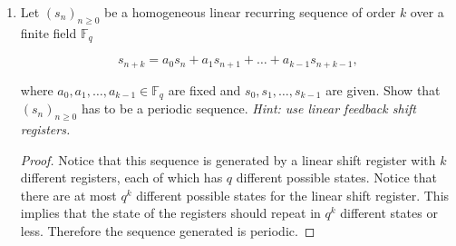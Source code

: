 \documentclass[12pt]{article}
\begin{document}
\begin{enumerate}
    \begin{proof}
    The generator matrix is given by:
    
    $$\left ( \begin{array}{*{9} c}
         2 & 0 & 0 & 1 & 0 & 0 & 0 & 0 & 0  \\
         0 & 2 & 0 & 0 & 1 & 0 & 0 & 0 & 0 \\ 
         0 & 0 & 2 & 0 & 0 & 1 & 0 & 0 & 0 \\
         0 & 0 & 0 & 2 & 0 & 0 & 1 & 0 & 0 \\
         0 & 0 & 0 & 0 & 2 & 0 & 0 & 1 & 0 \\
         0 & 0 & 0 & 0 & 0 & 2 & 0 & 0 & 1 \\
    \end{array} \right )$$
    
    Operating the matrix above through elementary operations yields the following systematic generator matrix:
    
    $$G =\left ( \begin{array}{*{9}c}
         1 & 0 & 0 & 0 & 0 & 0 & 2 & 0 & 0\\
         0 & 1 & 0 & 0 & 0 & 0 & 0 & 2 & 0\\
         0 & 0 & 1 & 0 & 0 & 0 & 0 & 0 & 2\\
         0 & 0 & 0 & 1 & 0 & 0 & 2 & 0 & 0 \\
         0 & 0 & 0 & 0 & 1 & 0 & 0 & 2 & 0\\
         0 & 0 & 0 & 0 & 0 & 1 & 0 & 0 & 2\\
    \end{array}\right)$$
    \end{proof}
    
    \item Let $(s_n)_{n \geq 0}$ be a homogeneous linear recurring sequence of order $k$ over a finite field $\mathbb{F}_q$
    
    $$ s_{n+k} = a_0 s_n + a_1 s_{n+1}+ \ldots + a_{k-1}s_{n+k-1},$$
    
    where $a_0, a_1, \ldots, a_{k-1} \in \mathbb{F}_q$ are fixed and $s_0, s_1, \ldots, s_{k-1}$ are given. Show that $(s_n)_{n \geq 0}$ has to be a periodic sequence.
    \emph{Hint: use linear feedback shift registers.}
    
    \begin{proof}
    Notice that this sequence is generated by a linear shift register with $k$ different registers, each of which has $q$ different possible states. Notice that there are at most $q^k$ different possible states for the linear shift register. This implies that the state of the registers should repeat in $q^k$ different states or less. Therefore the sequence generated is periodic.
    \end{proof}
\end{enumerate}
\end{document}
